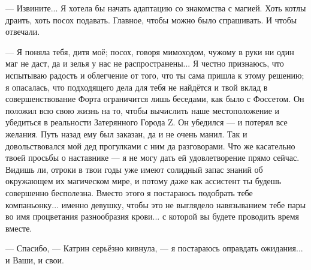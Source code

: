 --- Извините... Я хотела бы начать адаптацию со знакомства с магией. Хоть котлы драить, хоть посох подавать.
Главное, чтобы можно было спрашивать. И чтобы отвечали.

--- Я поняла тебя, дитя моё; посох, говоря мимоходом, чужому в руки ни один маг не даст, да и зелья у нас не распространены...
Я честно признаюсь, что испытываю радость и облегчение от того, что ты сама пришла к этому решению;
я опасалась, что подходящего дела для тебя не найдётся и твой вклад в совершенствование Форта ограничится лишь беседами,
как было с Фоссетом.
Он положил всю свою жизнь на то, чтобы вычислить наше местоположение и убедиться в реальности Затерянного Города Z.
Он убедился --- и потерял все желания. Путь назад ему был заказан, да и не очень манил.
Так и довольствовался мой дед прогулками с ним да разговорами.
Что же касательно твоей просьбы о наставнике --- я не могу дать ей удовлетворение прямо сейчас.
Видишь ли, отроки в твои годы уже имеют солидный запас знаний об окружающем их магическом мире,
и потому даже как ассистент ты будешь совершенно бесполезна.
Вместо этого я постараюсь подобрать тебе компаньонку... именно девушку,
чтобы это не выглядело навязыванием тебе пары во имя процветания разнообразия крови...
с которой вы будете проводить время вместе.

--- Спасибо, --- Катрин серьёзно кивнула, --- я постараюсь оправдать ожидания... и Ваши, и свои.

\emptypar

\emptypar

